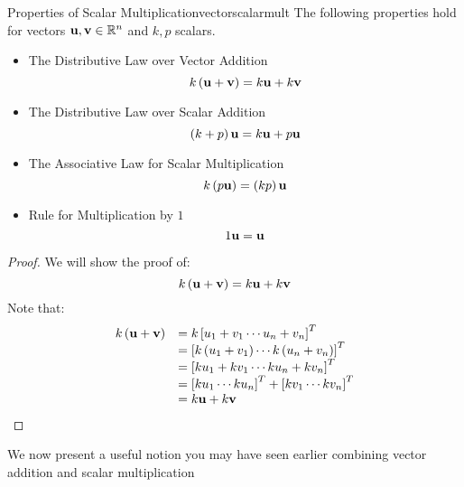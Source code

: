 \begin{theorem}{Properties of Scalar Multiplication}{vectorscalarmult}
The following properties hold for vectors ${\bf u},{\bf v}\in \mathbb{R}^{n}$ and $k,p $
scalars.
\begin{itemize}
\item The Distributive Law over Vector Addition
\begin{equation*}
k \left( {\bf u}+{\bf v}\right) = k{\bf u}+ k{\bf v}
\end{equation*}
\item The Distributive Law over Scalar Addition
\begin{equation*}
\left( k + p  \right){\bf u} = k {\bf u}+p {\bf u}
\end{equation*}
\item The Associative Law for Scalar Multiplication
\begin{equation*}
k \left( p {\bf u}\right) = \left(k p \right){\bf u}
\end{equation*}
\item Rule for Multiplication by $1$
\begin{equation*}
1{\bf u}={\bf u}  
\end{equation*}
\end{itemize}
\end{theorem}

\begin{proof}
We will show the proof of: 
\begin{equation*}
k \left( {\bf u}+{\bf v}\right) = k {\bf u}+ k {\bf v}
\end{equation*}
Note that:
\begin{equation*}
\begin{array}{ll}
k \left( {\bf u}+{\bf v}\right) & =k \left[ u_{1}+v_{1} \cdots u_{n}+v_{n}\right]^T \\
& = \left[ k \left( u_{1}+v_{1}\right) \cdots k \left( u_{n}+v_{n}\right) \right]^T \\
& = \left[ k u_{1}+ k  v_{1} \cdots k u_{n}+ k v_{n}\right]^T \\
& = \left[ k u_{1} \cdots k u_{n} \right]^T + \left[ k v_{1} \cdots k v_{n} \right]^T \\
& = k {\bf u}+k {\bf v} \\
\end{array}
\end{equation*}
\end{proof}

We now present a useful notion you may have seen earlier combining vector addition and scalar multiplication

